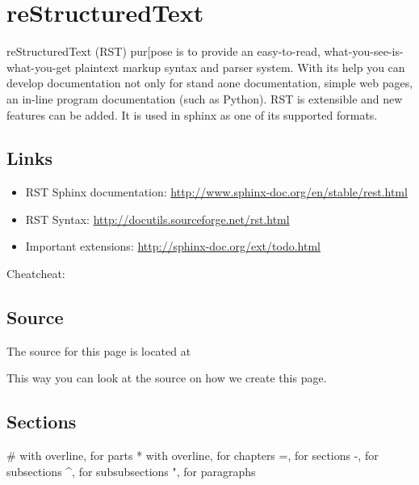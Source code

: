 \FILENAME

\section{reStructuredText}\label{restructuredtext}

reStructuredText (RST) pur{[}pose is to provide an easy-to-read,
what-you-see-is-what-you-get plaintext markup syntax and parser system.
With its help you can develop documentation not only for stand aone
documentation, simple web pages, an in-line program documentation (such
as Python). RST is extensible and new features can be added. It is used
in sphinx as one of its supported formats.

\subsection{Links}\label{links}

\begin{itemize}

\item
  RST Sphinx documentation:
  \url{http://www.sphinx-doc.org/en/stable/rest.html}
\item
  RST Syntax: \url{http://docutils.sourceforge.net/rst.html}
\item
  Important extensions: \url{http://sphinx-doc.org/ext/todo.html}
\end{itemize}

Cheatcheat:
\smallskip


\subsection{Source}\label{source}

The source for this page is located at


This way you can look at the source on how we create this page.

\subsection{Sections}\label{sections}

\# with overline, for parts * with overline, for chapters =, for
sections -, for subsections \^{}, for subsubsections ", for paragraphs

